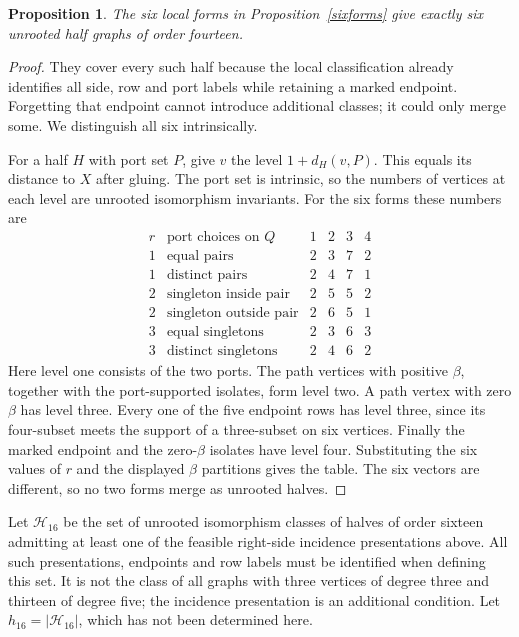 \documentclass[11pt]{article}
\newtheorem{proposition}[theorem]{Proposition}
\begin{document}
\begin{proposition}\label{leftunrooted}
The six local forms in Proposition~\ref{sixforms} give exactly six
unrooted half graphs of order fourteen.
\end{proposition}
\begin{proof}
They cover every such half because the local classification already
identifies all side, row and port labels while retaining a marked
endpoint. Forgetting that endpoint cannot introduce additional classes;
it could only merge some. We distinguish all six intrinsically.

For a half $H$ with port set $P$, give $v$ the level
$1+d_H(v,P)$. This equals its distance to $X$ after gluing. The port
set is intrinsic, so the numbers of vertices at each level are unrooted
isomorphism invariants. For the six forms these numbers are
\[
\begin{array}{c|l|rrrr}
 r&\text{port choices on }Q&1&2&3&4\\\hline
 1&\text{equal pairs}&2&3&7&2\\
 1&\text{distinct pairs}&2&4&7&1\\
 2&\text{singleton inside pair}&2&5&5&2\\
 2&\text{singleton outside pair}&2&6&5&1\\
 3&\text{equal singletons}&2&3&6&3\\
 3&\text{distinct singletons}&2&4&6&2
\end{array}
\]
Here level one consists of the two ports. The path vertices with
positive $\beta$, together with the port-supported isolates, form
level two. A path vertex with zero $\beta$ has level three. Every one
of the five endpoint rows has level three, since its four-subset meets
the support of a three-subset on six vertices. Finally the marked
endpoint and the zero-$\beta$ isolates have level four. Substituting
the six values of $r$ and the displayed $\beta$ partitions gives the
table. The six vectors are different, so no two forms merge as unrooted
halves.
\end{proof}

Let $\mathcal H_{16}$ be the set of unrooted isomorphism classes of
halves of order sixteen admitting at least one of the feasible right-side
incidence presentations above. All such presentations, endpoints and
row labels must be identified when defining this set. It is not the
class of all graphs with three vertices of degree three and thirteen
of degree five; the incidence presentation is an additional condition.
Let $h_{16}=|\mathcal H_{16}|$, which has not been determined here.
\end{document}
